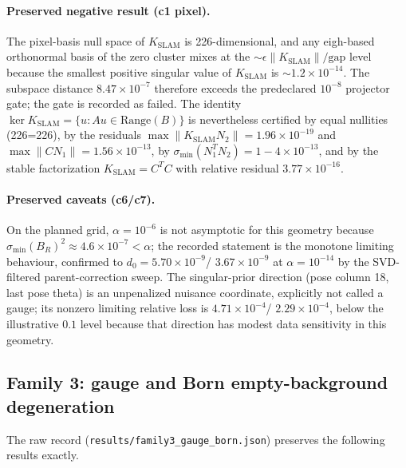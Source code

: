 \documentclass[12pt]{article}
\begin{document}
\paragraph{Preserved negative result (c1 pixel).}
The pixel-basis null space of $K_{\mathrm{SLAM}}$ is 226-dimensional, and any
eigh-based orthonormal basis of the zero cluster mixes at the
$\sim\epsilon\|K_{\mathrm{SLAM}}\|/\mathrm{gap}$ level because the smallest
positive singular value of $K_{\mathrm{SLAM}}$ is $\sim1.2\times10^{-14}$. The
subspace distance $8.47\times10^{-7}$ therefore exceeds the predeclared
$10^{-8}$ projector gate; the gate is recorded as failed. The identity
$\ker K_{\mathrm{SLAM}}=\{u:Au\in\mathrm{Range}(B)\}$ is nevertheless certified
by equal nullities (226=226), by the residuals
$\max\|K_{\mathrm{SLAM}}N_2\|=1.96\times10^{-19}$ and
$\max\|C N_1\|=1.56\times10^{-13}$, by
$\sigma_{\min}(N_1^TN_2)=1-4\times10^{-13}$, and by the stable factorization
$K_{\mathrm{SLAM}}=C^TC$ with relative residual $3.77\times10^{-16}$.

\paragraph{Preserved caveats (c6/c7).}
On the planned grid, $\alpha=10^{-6}$ is not asymptotic for this geometry
because $\sigma_{\min}(B_R)^2\approx4.6\times10^{-7}<\alpha$; the recorded
statement is the monotone limiting behaviour, confirmed to
$d_0=5.70\times10^{-9}$/ $3.67\times10^{-9}$ at $\alpha=10^{-14}$ by the
SVD-filtered parent-correction sweep. The singular-prior direction (pose
column 18, last pose theta) is an unpenalized nuisance coordinate, explicitly
not called a gauge; its nonzero limiting relative loss is
$4.71\times10^{-4}$/ $2.29\times10^{-4}$, below the illustrative $0.1$ level
because that direction has modest data sensitivity in this geometry.

\subsection{Family 3: gauge and Born empty-background degeneration}\label{sec:family3}

The raw record (\texttt{results/family3\_gauge\_born.json}) preserves the following
results exactly.
\end{document}
